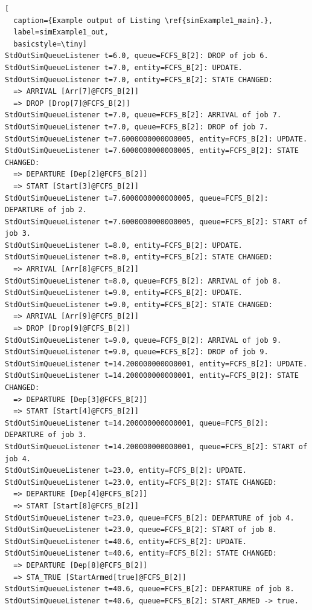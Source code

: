 \documentclass[12pt]{book}
\begin{document}
\begin{lstfloat}
\begin{lstlisting}[
  caption={Example output of Listing \ref{simExample1_main}.},
  label=simExample1_out,
  basicstyle=\tiny]
StdOutSimQueueListener t=6.0, queue=FCFS_B[2]: DROP of job 6.
StdOutSimQueueListener t=7.0, entity=FCFS_B[2]: UPDATE.
StdOutSimQueueListener t=7.0, entity=FCFS_B[2]: STATE CHANGED:
  => ARRIVAL [Arr[7]@FCFS_B[2]]
  => DROP [Drop[7]@FCFS_B[2]]
StdOutSimQueueListener t=7.0, queue=FCFS_B[2]: ARRIVAL of job 7.
StdOutSimQueueListener t=7.0, queue=FCFS_B[2]: DROP of job 7.
StdOutSimQueueListener t=7.6000000000000005, entity=FCFS_B[2]: UPDATE.
StdOutSimQueueListener t=7.6000000000000005, entity=FCFS_B[2]: STATE CHANGED:
  => DEPARTURE [Dep[2]@FCFS_B[2]]
  => START [Start[3]@FCFS_B[2]]
StdOutSimQueueListener t=7.6000000000000005, queue=FCFS_B[2]: DEPARTURE of job 2.
StdOutSimQueueListener t=7.6000000000000005, queue=FCFS_B[2]: START of job 3.
StdOutSimQueueListener t=8.0, entity=FCFS_B[2]: UPDATE.
StdOutSimQueueListener t=8.0, entity=FCFS_B[2]: STATE CHANGED:
  => ARRIVAL [Arr[8]@FCFS_B[2]]
StdOutSimQueueListener t=8.0, queue=FCFS_B[2]: ARRIVAL of job 8.
StdOutSimQueueListener t=9.0, entity=FCFS_B[2]: UPDATE.
StdOutSimQueueListener t=9.0, entity=FCFS_B[2]: STATE CHANGED:
  => ARRIVAL [Arr[9]@FCFS_B[2]]
  => DROP [Drop[9]@FCFS_B[2]]
StdOutSimQueueListener t=9.0, queue=FCFS_B[2]: ARRIVAL of job 9.
StdOutSimQueueListener t=9.0, queue=FCFS_B[2]: DROP of job 9.
StdOutSimQueueListener t=14.200000000000001, entity=FCFS_B[2]: UPDATE.
StdOutSimQueueListener t=14.200000000000001, entity=FCFS_B[2]: STATE CHANGED:
  => DEPARTURE [Dep[3]@FCFS_B[2]]
  => START [Start[4]@FCFS_B[2]]
StdOutSimQueueListener t=14.200000000000001, queue=FCFS_B[2]: DEPARTURE of job 3.
StdOutSimQueueListener t=14.200000000000001, queue=FCFS_B[2]: START of job 4.
StdOutSimQueueListener t=23.0, entity=FCFS_B[2]: UPDATE.
StdOutSimQueueListener t=23.0, entity=FCFS_B[2]: STATE CHANGED:
  => DEPARTURE [Dep[4]@FCFS_B[2]]
  => START [Start[8]@FCFS_B[2]]
StdOutSimQueueListener t=23.0, queue=FCFS_B[2]: DEPARTURE of job 4.
StdOutSimQueueListener t=23.0, queue=FCFS_B[2]: START of job 8.
StdOutSimQueueListener t=40.6, entity=FCFS_B[2]: UPDATE.
StdOutSimQueueListener t=40.6, entity=FCFS_B[2]: STATE CHANGED:
  => DEPARTURE [Dep[8]@FCFS_B[2]]
  => STA_TRUE [StartArmed[true]@FCFS_B[2]]
StdOutSimQueueListener t=40.6, queue=FCFS_B[2]: DEPARTURE of job 8.
StdOutSimQueueListener t=40.6, queue=FCFS_B[2]: START_ARMED -> true.

\end{lstlisting}
\end{lstfloat}
\end{document}
